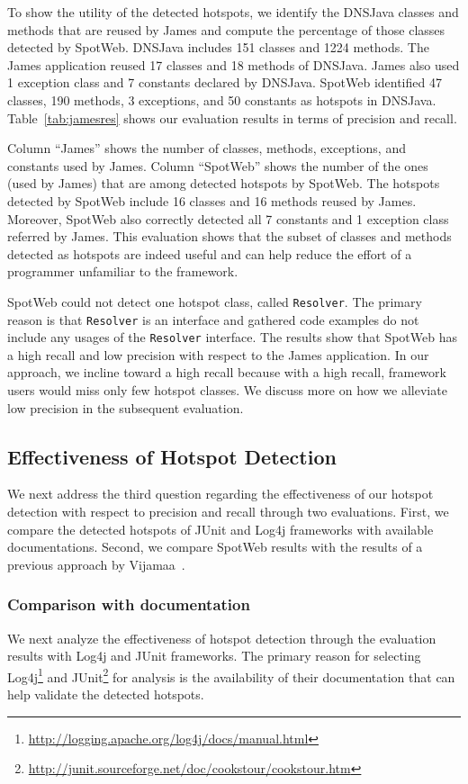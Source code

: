 \documentclass[conference]{IEEEtran}
\newcommand{\Fix}[1]{#1}
\newcommand{\CodeIn}[1]{{\small\texttt{#1}}}
\begin{document}
To show the utility of the detected hotspots, we identify the DNSJava classes 
and methods that are reused by James and compute the percentage of those classes detected
by SpotWeb. DNSJava includes 151 classes and 1224 methods. The
James application reused 17 classes and 18 methods of DNSJava. James also used 1 exception
class and 7 constants declared by DNSJava. \Fix{SpotWeb identified 47 classes, 190 methods, 3 exceptions,
and 50 constants as hotspots in DNSJava. Table~\ref{tab:jamesres} shows our evaluation results
in terms of precision and recall.

Column ``James'' shows the number of classes, 
methods, exceptions, and constants used by James. Column ``SpotWeb'' shows the
number of the ones (used by James) that are among detected hotspots by SpotWeb. 
The hotspots detected by SpotWeb include 16 classes and 16 methods reused by James. Moreover, SpotWeb also correctly
detected all 7 constants and 1 exception class referred by James. This evaluation shows that 
the subset of classes and methods detected as hotspots are 
indeed useful and can help reduce the effort of a programmer unfamiliar
to the framework.

SpotWeb could not detect one hotspot
class, called \CodeIn{Resolver}. The primary reason is that \CodeIn{Resolver} is an interface
and gathered code examples do not include any usages of the \CodeIn{Resolver} interface.
The results show that SpotWeb has a high recall and low precision with respect
to the James application. In our approach, we incline toward a high recall because
with a high recall, framework users would miss only few hotspot classes. We discuss
more on how we alleviate low precision in the subsequent evaluation.}
\subsection{Effectiveness of Hotspot Detection}
We next address the third question regarding the effectiveness of our hotspot detection
with respect to precision and recall through two evaluations. First, we compare
the detected hotspots of JUnit and Log4j frameworks with available documentations.
Second, we compare SpotWeb results with the results of a previous approach 
by Vijamaa~\cite{viljamaa:reverse}.

\subsubsection{Comparison with documentation}
\label{sec:doccomp}
We next analyze the effectiveness of hotspot detection through the
evaluation results with Log4j and JUnit frameworks. The primary
reason for selecting Log4j\footnote{\url{http://logging.apache.org/log4j/docs/manual.html}}
and JUnit\footnote{\url{http://junit.sourceforge.net/doc/cookstour/cookstour.htm}}
for analysis is the availability of their documentation that can
help validate the detected hotspots. 
\end{document}
